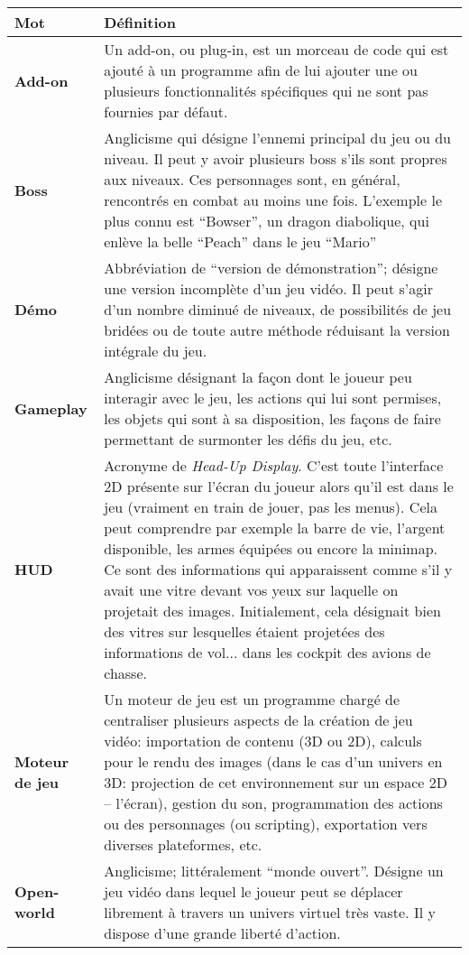 \documentclass[a4paper, 10pt, oneside, fleqn]{report}
\begin{document}
	\begin{longtabu} to 
		\rowfont{\bfseries\sffamily\leavevmode\color{white}}
		Mot & Définition\\
		\endhead
		\endfoot
		Add-on & Un add-on, ou plug-in, est un morceau de code qui est ajouté à un programme afin de lui ajouter une ou plusieurs fonctionnalités spécifiques qui ne sont pas fournies par défaut.\\
		Boss & Anglicisme qui désigne l'ennemi principal du jeu ou du niveau. Il peut y avoir plusieurs boss s'ils sont propres aux niveaux. Ces personnages sont, en général, rencontrés en combat au moins une fois. L'exemple le plus connu est \enquote{Bowser}, un dragon diabolique, qui enlève la belle \enquote{Peach} dans le jeu \enquote{Mario}\\
		Démo & Abbréviation de \enquote{version de démonstration}; désigne une version incomplète d'un jeu vidéo. Il peut s'agir d'un nombre diminué de niveaux, de possibilités de jeu bridées ou de toute autre méthode réduisant la version intégrale du jeu.\\
		Gameplay & Anglicisme désignant la façon dont le joueur peu interagir avec le jeu, les actions qui lui sont permises, les objets qui sont à sa disposition, les façons de faire permettant de surmonter les défis du jeu, etc.\\
		HUD & Acronyme de \textit{Head-Up Display}. C'est toute l'interface 2D présente sur l'écran du joueur alors qu'il est dans le jeu (vraiment en train de jouer, pas les menus). Cela peut comprendre par exemple la barre de vie, l'argent disponible, les armes équipées ou encore la minimap. Ce sont des informations qui apparaissent comme s'il y avait une vitre devant vos yeux sur laquelle on projetait des images. Initialement, cela désignait bien des vitres sur lesquelles étaient projetées des informations de vol... dans les cockpit des avions de chasse.\\
		Moteur de jeu & Un moteur de jeu est un programme chargé de centraliser plusieurs aspects de la création de jeu vidéo: importation de contenu (3D ou 2D), calculs pour le rendu des images (dans le cas d'un univers en 3D: projection de cet environnement sur un espace 2D -- l'écran), gestion du son, programmation des actions ou des personnages (ou scripting), exportation vers diverses plateformes, etc.\\
		Open-world & Anglicisme; littéralement \enquote{monde ouvert}. Désigne un jeu vidéo dans lequel le joueur peut se déplacer librement à travers un univers virtuel très vaste. Il y dispose d'une grande liberté d'action.\\

\end{longtabu}
\end{document}
